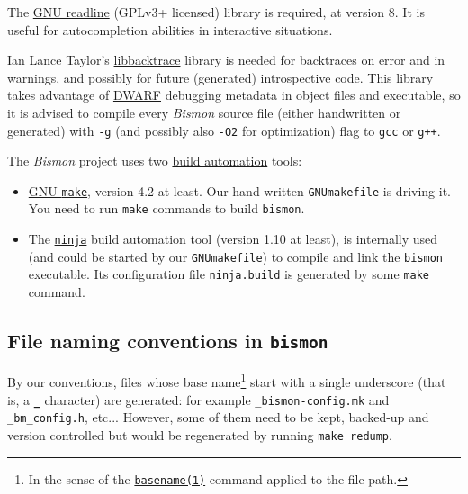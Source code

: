 \begin{appendices}
The \href{https://www.gnu.org/software/readline/}{GNU readline}
(GPLv3+ licensed) library is required, at version 8. It is useful for
autocompletion abilities in interactive situations.

Ian Lance Taylor's
\href{https://github.com/ianlancetaylor/libbacktrace}{libbacktrace}
library is needed for backtraces on error and in warnings, and
possibly for future (generated) introspective code. This library takes
advantage of \href{https://en.wikipedia.org/wiki/DWARF}{DWARF}
debugging metadata in object files and executable, so it is advised to
compile every \emph{Bismon} source file (either handwritten or
generated) with \texttt{-g} (and possibly also \texttt{-O2} for
optimization) flag to \texttt{gcc} or \texttt{g++}.


The \emph{Bismon} project  uses two \href{https://en.wikipedia.org/wiki/Build_automation}{build automation} tools:

\begin{itemize}

\item \href{https://www.gnu.org/software/make/}{GNU \texttt{make}},
  version 4.2 at least. Our hand-written \texttt{GNUmakefile} is
  driving it. You need to run \texttt{make} commands to build
  \texttt{bismon}.

\item
  The \href{https://ninja-build.org/}{\texttt{ninja}} build automation
  tool (version 1.10 at least), is internally used (and could be
  started by our \texttt{GNUmakefile}) to compile and link the
  \texttt{bismon} executable. Its configuration file
  \texttt{ninja.build} is generated by some \texttt{make} command.

\end{itemize}
  
\subsection{File naming conventions in \texttt{bismon}}

By our conventions, files  
whose base name\footnote{In the sense of the
\href{https://man7.org/linux/man-pages/man1/basename.1.html}{\texttt{basename(1)}}
command applied to the file path.} start with a single underscore
(that is, a \textbf{\texttt{\_}} character) are generated: for example
\texttt{\_bismon-config.mk} and \texttt{\_bm\_config.h},
etc... However, some of them need to be kept, backed-up and version
controlled but would be regenerated by running
 
 \texttt{make redump}.


\end{appendices}
